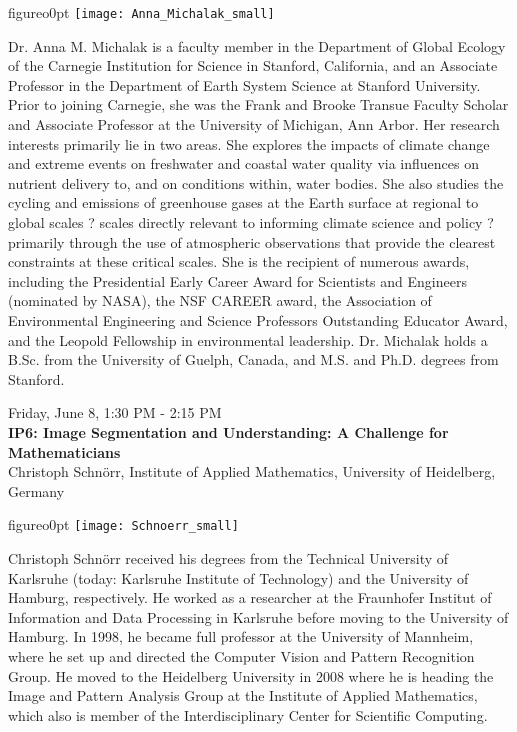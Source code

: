 \begin{wrapfloat}{figure}{o}{0pt}
\texttt{[image: Anna\_Michalak\_small]}
\end{wrapfloat}
Dr. Anna M. Michalak is a faculty member in the Department of Global Ecology of the Carnegie Institution for Science in Stanford, California, and an Associate Professor in the Department of Earth System Science at Stanford University. Prior to joining Carnegie, she was the Frank and Brooke Transue Faculty Scholar and Associate Professor at the University of Michigan, Ann Arbor. Her research interests primarily lie in two areas. She explores the impacts of climate change and extreme events on freshwater and coastal water quality via influences on nutrient delivery to, and on conditions within, water bodies. She also studies the cycling and emissions of greenhouse gases at the Earth surface at regional to global scales ? scales directly relevant to informing climate science and policy ? primarily through the use of atmospheric observations that provide the clearest constraints at these critical scales. She is the recipient of numerous awards, including the Presidential Early Career Award for Scientists and Engineers (nominated by NASA), the NSF CAREER award, the Association of Environmental Engineering and Science Professors Outstanding Educator Award, and the Leopold Fellowship in environmental leadership. Dr. Michalak holds a B.Sc. from the University of Guelph, Canada, and M.S. and Ph.D. degrees from Stanford.

\newpage\vspace{2cm}
\begin{center}{\Large{
Friday, June 8, 1:30 PM - 2:15 PM \\
\textbf{IP6: Image Segmentation and Understanding: A Challenge for Mathematicians}\\
Christoph Schn\"{o}rr, Institute of Applied Mathematics, University of Heidelberg, Germany}}
\end{center}
\vspace{1cm}

\begin{wrapfloat}{figure}{o}{0pt}
\texttt{[image: Schnoerr\_small]}
\end{wrapfloat}
Christoph Schn\"{o}rr received his degrees from the Technical University of Karlsruhe (today: Karlsruhe Institute of Technology) and the University of Hamburg, respectively. He worked as a researcher at the Fraunhofer Institut of Information and Data Processing in Karlsruhe before moving to the University of Hamburg. In 1998, he became full professor at the University of Mannheim, where he set up and directed the Computer Vision and Pattern Recognition Group. He moved to the Heidelberg University in 2008 where he is heading the Image and Pattern Analysis Group at the Institute of Applied Mathematics, which also is member of the Interdisciplinary Center for Scientific Computing.

